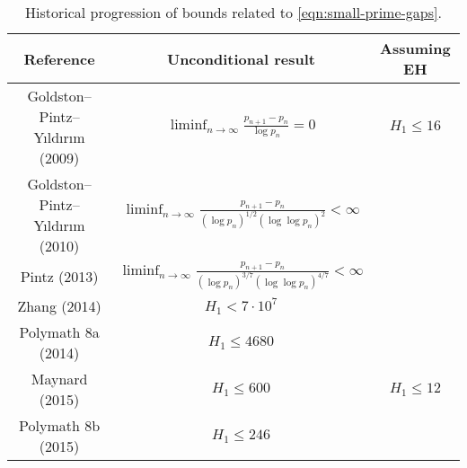 \begin{table}[ht]
    \caption{Historical progression of bounds related to \eqref{eqn:small-prime-gaps}.}
    \centering
    \renewcommand{\arraystretch}{2.2}
    \begin{tabular}{|c|c|c|}
    \hline
    Reference & Unconditional result & Assuming EH \\
    \hline
    Goldston--Pintz--Yıldırım (2009) \cite{goldston_primes_2009} & $\displaystyle\liminf_{n\to\infty}\frac{p_{n + 1} - p_n}{\log p_n} = 0$ & $H_1 \le 16$ \\
    \hline
    Goldston--Pintz--Yıldırım (2010) \cite{goldston_primes_2010} & $\displaystyle\liminf_{n\to\infty}\frac{p_{n + 1} - p_n}{(\log p_n)^{1/2}(\log\log p_n)^2} < \infty$ & \\
    \hline
    Pintz (2013) \cite{Pintz_3747} & $\displaystyle\liminf_{n\to\infty}\frac{p_{n + 1} - p_n}{(\log p_n)^{3/7}(\log\log p_n)^{4/7}} < \infty$ & \\
    \hline
    Zhang (2014) \cite{zhang_bounded_2014} & $H_1 < 7\cdot 10^7$ & \\
    \hline
    Polymath 8a (2014) \cite{castryck_new_2014} & $H_1 \le 4680$ & \\
    \hline
    Maynard (2015) \cite{maynard_small_2015} & $H_1 \le 600$ & $H_1 \le 12$ \\
    \hline
    Polymath 8b (2015) \cite{polymath_variants_2014} & $H_1 \le 246$ & \\
    \hline
    \end{tabular}
\end{table}\label{small-primegap-table}

